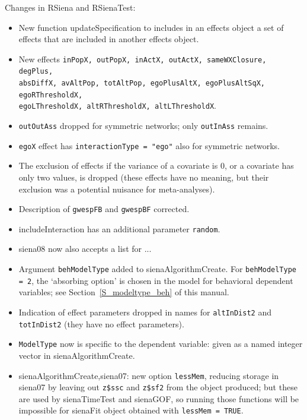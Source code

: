 \documentclass[a4paper,fleqn,11pt]{article}
\newcommand{\+}{\, + \,}
\newcommand{\sfn}[1]{\textsf{#1}}
\begin{document}
\begin{small}
\begin{itemize}
Changes in \textsf{RSiena} and \textsf{RSienaTest}:
\begin{itemize}
   \item New function \sfn{updateSpecification} to includes in an
   effects object a set of effects that are included in another effects object.
   \item New effects \texttt{inPopX, outPopX, inActX, outActX, sameWXClosure, degPlus,\\
     absDiffX, avAltPop, totAltPop, egoPlusAltX, egoPlusAltSqX,
     egoRThresholdX, \\ egoLThresholdX, altRThresholdX, altLThresholdX}.
   \item \texttt{outOutAss} dropped for symmetric networks;
   only \texttt{outInAss} remains.
   \item \texttt{egoX} effect has \texttt{interactionType = "ego"}
   also for symmetric networks.
   \item The exclusion of effects if the variance of a covariate is 0,
     or a covariate has only two values, is dropped (these effects have no meaning,
     but their exclusion was a potential nuisance for meta-analyses).
   \item Description of \texttt{gwespFB} and \texttt{gwespBF} corrected.
   \item \sfn{includeInteraction} has an additional parameter \texttt{random}.
   \item \textsf{siena08} now also accepts a list for ...
   \item Argument \texttt{behModelType} added to \textsf{sienaAlgorithmCreate}.
       For \texttt{behModelType = 2}, the `absorbing option' is chosen
     in the model for behavioral dependent variables;
     see Section~\ref{S_modeltype_beh} of this manual.
   \item Indication of effect parameters dropped in names for
     \texttt{altInDist2} and \texttt{totInDist2} (they have no effect parameters).
   \item \texttt{ModelType} now is specific to the dependent variable:
     given as a named integer vector in \textsf{sienaAlgorithmCreate}.
   \item \sfn{sienaAlgorithmCreate,\textsf{siena07}}: new option \texttt{lessMem},
      reducing storage in \textsf{siena07} by leaving out
      \texttt{z\$ssc} and \texttt{z\$sf2} from the object produced;
      but these are used by
     \textsf{sienaTimeTest} and \textsf{sienaGOF}, so running those functions will be impossible
     for \sfn{sienaFit} object obtained with \texttt{lessMem = TRUE}.

\end{itemize}
\end{itemize}
\end{small}
\end{document}
